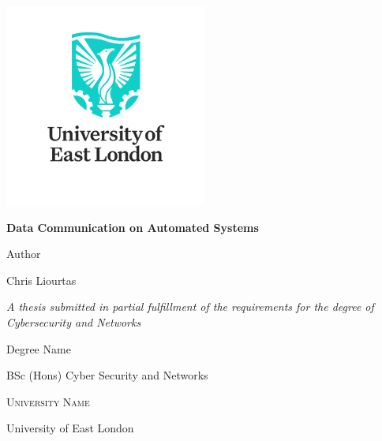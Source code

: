 \begin{titlepage}
    \centering
    \includegraphics[width=0.50\textwidth]{images/university.png}\par\vspace{1cm} %
    {\Huge \bfseries Data Communication on Automated Systems \par}
    \vspace{1cm}
    {\Large Author\par}
    {\large Chris Liourtas\par}
    \vspace{2cm}
    \textit{A thesis submitted in partial fulfillment of the requirements for the degree of Cybersecurity and Networks}\par
    \vspace{0.5cm}
    {\Large Degree Name\par}
    {\large BSc (Hons) Cyber Security and Networks\par}
    \vspace{2cm}
    \textsc{University Name}\par
    {\large University of East London}
\end{titlepage}
